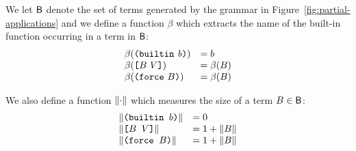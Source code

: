 \medskip
\noindent We let $\mathsf{B}$ denote the set of terms generated by the grammar
in Figure~\ref{fig:partial-applications} and 
we define a function $\beta$ which extracts the name of the built-in
function occurring in a term in $\mathsf{B}$:
$$
 \begin{array}{ll}
 \beta(\texttt{(} \texttt{builtin} ~ \mathit{b} \texttt{)}) &= b\\
 \beta(\texttt{[} B ~ V \texttt{]}) & =\beta(B)\\
 \beta({\texttt{(} \texttt{force} ~ B \texttt{)}}) & =\beta(B)\\
\end{array}
$$%


\noindent We also define a function $\lVert \cdot \rVert$ which measures the size of
a term $B \in \mathsf{B}$:
$$
\begin{array}{ll}
\lVert \texttt{(builtin $b$)} \rVert &= 0\\
\lVert \texttt{[$B$ $V$]} \rVert &= 1+\lVert B \rVert\\
\lVert \texttt{(force $B$)} \rVert & = 1+\lVert B \rVert
\end{array}
$$%




